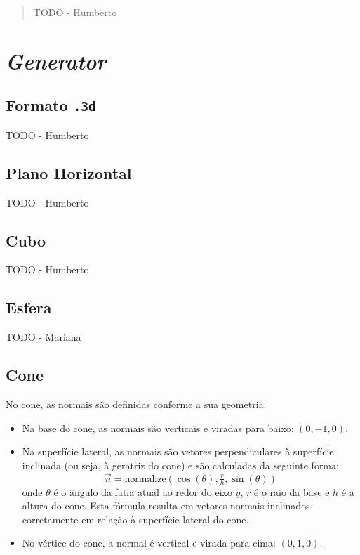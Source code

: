 \documentclass[12pt, a4paper]{article}
\begin{document}
\pagebreak

\begin{abstract}
    \noindent
    {\color{red} TODO - Humberto}
\end{abstract}

\section{\emph{Generator}}

\subsection{Formato \texttt{.3d}}

{\color{red} TODO - Humberto}

\subsection{Plano Horizontal}

{\color{red} TODO - Humberto}

\subsection{Cubo}

{\color{red} TODO - Humberto}

\subsection{Esfera}

{\color{red} TODO - Mariana}

\subsection{Cone}

No cone, as normais são definidas conforme a sua geometria:

\begin{itemize}
    \item Na base do cone, as normais são verticais e viradas para baixo: $(0, -1, 0)$.
    \item Na superfície lateral, as normais são vetores perpendiculares à superfície
    inclinada (ou seja, à geratriz do cone) e são calculadas da seguinte forma:
\[
\vec{n} = \text{normalize}(\cos(\theta), \tfrac{r}{h}, \sin(\theta))
\]
onde \( \theta \) é o ângulo da fatia atual ao redor do eixo \( y \), \( r \) é o raio da
base e \( h \) é a altura do cone.
Esta fórmula resulta em vetores normais inclinados corretamente em relação à superfície
lateral do cone.

    \item No vértice do cone, a normal é vertical e virada para cima: $(0, 1, 0)$.
\end{itemize}
\end{document}
